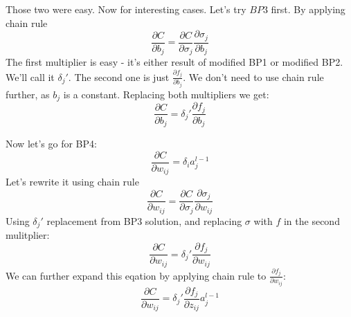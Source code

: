 \documentclass{article}
\begin{document}
Those two were easy. Now for interesting cases. Let's try $BP3$ first. By applying chain rule
$$\frac{\partial C}{\partial b_j} = \frac{\partial C}{\partial \sigma_j} \frac{\partial \sigma_j}{\partial b_j}$$
The first multiplier is easy - it's either result of modified BP1 or modified BP2. We'll call it $\delta_j'$.
The second one is just $\frac{\partial f_j}{\partial b_j}$. We don't need to use chain rule further, as $b_j$ is a constant.
Replacing both multipliers we get:
$$\frac{\partial C}{\partial b_j} = \delta_j' \frac{\partial f_j}{\partial b_j}$$

Now let's go for BP4:
$$\frac{\partial C}{\partial w_{ij}} = \delta_i a^{l-1}_{j}$$
Let's rewrite it using chain rule
$$\frac{\partial C}{\partial w_{ij}} = \frac{\partial C}{\partial \sigma_j} \frac{\partial \sigma_j}{\partial w_{ij}}$$
Using $\delta_j'$ replacement from BP3 solution, and replacing $\sigma$ with $f$ in the second mulitplier:
$$\frac{\partial C}{\partial w_{ij}} = \delta_j' \frac{\partial f_j}{\partial w_{ij}}$$
We can further expand this eqation by applying chain rule to $\frac{\partial f_j}{\partial w_{ij}}$:
$$\frac{\partial C}{\partial w_{ij}} = \delta_j' \frac{\partial f_j}{\partial z_{ij}} a^{l-1}_{j}$$
\end{document}
